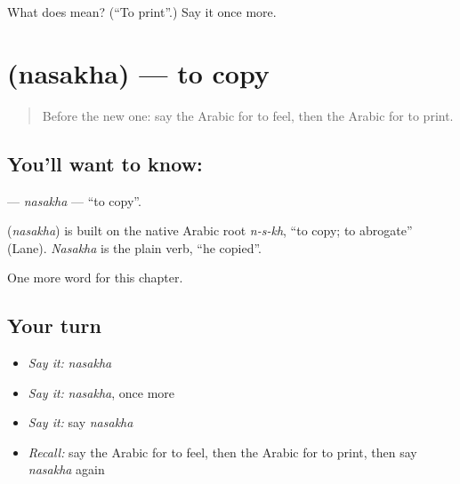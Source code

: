 \begin{tcolorbox}[breakable,colback=teal!4,colframe=teal!35!black,title={Before you move on}]
What does  mean? (\textquotedblleft{}To print\textquotedblright{}.) Say it once more.
\end{tcolorbox}
\section[\texorpdfstring{\ar{نسخ} (nasakha)}{نسخ (nasakha)}]{ (nasakha) — to copy}

\label{lesson:AR-C162-nasakha}



\begin{quote}
Before the new one: say the Arabic for to feel, then the Arabic for to print.
\end{quote}

\subsection*{You'll want to know: }
\textbf{} — \emph{nasakha} — \textquotedblleft{}to copy\textquotedblright{}.

\begin{cousinweb}
\textbf{} (\emph{nasakha}) is built on the native Arabic root \emph{n-s-kh}, \textquotedblleft{}to copy; to abrogate\textquotedblright{} (Lane). \emph{Nasakha} is the plain verb, \textquotedblleft{}he copied\textquotedblright{}.
\end{cousinweb}

\begin{grammarlens}[title={What you've built}]
One more word for this chapter.
\end{grammarlens}

\subsection*{Your turn}
\begin{itemize}
\raggedright
  \item \emph{Say it:} \emph{nasakha}
  \item \emph{Say it:} \emph{nasakha}, once more
  \item \emph{Say it:} say \emph{nasakha}
  \item \emph{Recall:} say the Arabic for to feel, then the Arabic for to print, then say \emph{nasakha} again
\end{itemize}

